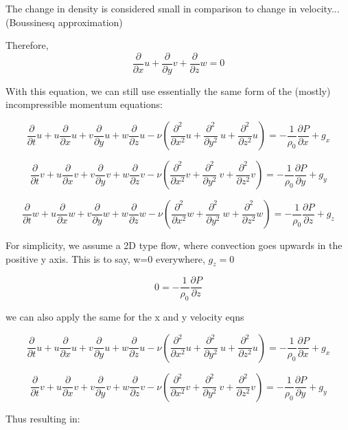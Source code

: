\documentclass[11pt]{article}
\begin{document}
The change in density is considered small in comparison to change in velocity... (Boussinesq approximation)

Therefore,
$$  \frac{\partial}{\partial x} u +  \frac{\partial}{\partial y} v +  \frac{\partial}{\partial z} w = 0$$

With this equation, we can still use essentially the same form of the (mostly) incompressible momentum equations:

$$\frac{\partial }{\partial t} u + u \frac{\partial}{\partial x} u + v \frac{\partial}{\partial y} u + w \frac{\partial}{\partial z} u - \nu ( \frac{\partial^2}{\partial x^2} u + \frac{\partial^2}{\partial y^2} \ u + \frac{\partial^2}{\partial z^2} u) = - \frac{1}{\rho_0} \frac{\partial P}{\partial x} +g_x$$

$$\frac{\partial }{\partial t} v + u \frac{\partial}{\partial x} v + v \frac{\partial}{\partial y} v + w \frac{\partial}{\partial z} v - \nu ( \frac{\partial^2}{\partial x^2} v + \frac{\partial^2}{\partial y^2} \ v + \frac{\partial^2}{\partial z^2} v) = - \frac{1}{\rho_0} \frac{\partial P}{\partial y} +g_y$$

$$\frac{\partial }{\partial t} w + u \frac{\partial}{\partial x} w + v \frac{\partial}{\partial y} w + w \frac{\partial}{\partial z} w - \nu ( \frac{\partial^2}{\partial x^2} w + \frac{\partial^2}{\partial y^2} \ w + \frac{\partial^2}{\partial z^2} w) = - \frac{1}{\rho_0} \frac{\partial P}{\partial z} +g_z$$

For simplicity, we assume a 2D type flow, where convection goes upwards in the positive y axis. This is to say, w=0 everywhere, $g_z=0$

$$0 = - \frac{1}{\rho_0} \frac{\partial P}{\partial z} $$

we can also apply the same for the x and y velocity eqns

$$\frac{\partial }{\partial t} u + u \frac{\partial}{\partial x} u + v \frac{\partial}{\partial y} u + w \frac{\partial}{\partial z} u - \nu ( \frac{\partial^2}{\partial x^2} u + \frac{\partial^2}{\partial y^2} \ u + \frac{\partial^2}{\partial z^2} u) = - \frac{1}{\rho_0} \frac{\partial P}{\partial x} +g_x$$

$$\frac{\partial }{\partial t} v + u \frac{\partial}{\partial x} v + v \frac{\partial}{\partial y} v + w \frac{\partial}{\partial z} v - \nu ( \frac{\partial^2}{\partial x^2} v + \frac{\partial^2}{\partial y^2} \ v + \frac{\partial^2}{\partial z^2} v) = - \frac{1}{\rho_0} \frac{\partial P}{\partial y} +g_y$$


Thus resulting in:
\end{document}
